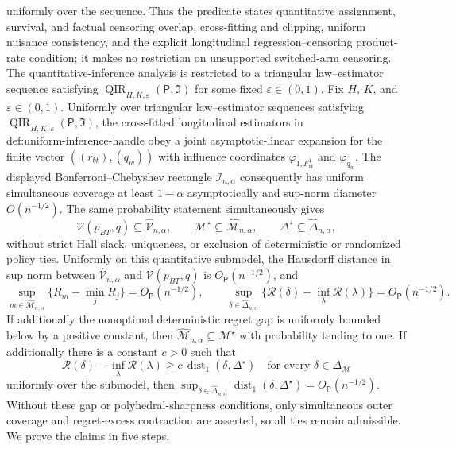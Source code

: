 uniformly over the sequence.  Thus the predicate states quantitative assignment, survival, and factual censoring overlap, cross-fitting and clipping, uniform nuisance consistency, and the explicit longitudinal regression--censoring product-rate condition; it makes no restriction on unsupported switched-arm censoring.
The quantitative-inference analysis is restricted to a triangular law--estimator sequence satisfying \(\operatorname{QIR}_{H,K,\varepsilon}(\mathsf P,\mathfrak I)\) for some fixed \(\varepsilon\in(0,1)\).
Fix \(H\), \(K\), and \(\varepsilon\in(0,1)\).  Uniformly over triangular law--estimator sequences satisfying \(\operatorname{QIR}_{H,K,\varepsilon}(\mathsf P,\mathfrak I)\), the cross-fitted longitudinal estimators in \(\text{def:uniform-inference-handle}\) obey a joint asymptotic-linear expansion for the finite vector \(((r_{bt}),(q_w))\) with influence coordinates \(\varphi_{1,F_{bt}^1}\) and \(\varphi_{q_w}\).  The displayed Bonferroni--Chebyshev rectangle \(\mathcal I_{n,\alpha}\) consequently has uniform simultaneous coverage at least \(1-\alpha\) asymptotically and sup-norm diameter \(O(n^{-1/2})\).  The same probability statement simultaneously gives
\[
 \mathcal V(p_{BT},q)\subseteq\widehat{\mathcal V}_{n,\alpha},\qquad
 \mathcal M^\star\subseteq\widehat{\mathcal M}_{n,\alpha},\qquad
 \Delta^\star\subseteq\widehat\Delta_{n,\alpha},
\]
without strict Hall slack, uniqueness, or exclusion of deterministic or randomized policy ties.  Uniformly on this quantitative submodel, the Hausdorff distance in sup norm between \(\widehat{\mathcal V}_{n,\alpha}\) and \(\mathcal V(p_{BT},q)\) is \(O_{\mathsf P}(n^{-1/2})\), and
\[
 \sup_{m\in\widehat{\mathcal M}_{n,\alpha}}
   \{R_m-\min_jR_j\}=O_{\mathsf P}(n^{-1/2}),
 \qquad
 \sup_{\delta\in\widehat\Delta_{n,\alpha}}
   \{\mathcal R(\delta)-\inf_\lambda\mathcal R(\lambda)\}
   =O_{\mathsf P}(n^{-1/2}).
\]
If additionally the nonoptimal deterministic regret gap is uniformly bounded below by a positive constant, then \(\widehat{\mathcal M}_{n,\alpha}\subseteq\mathcal M^\star\) with probability tending to one.  If additionally there is a constant \(c>0\) such that
\[
 \mathcal R(\delta)-\inf_\lambda\mathcal R(\lambda)
 \ge c\,\operatorname{dist}_1(\delta,\Delta^\star)
 \quad\text{for every }\delta\in\Delta_{\mathcal M}
\]
uniformly over the submodel, then
\(\sup_{\delta\in\widehat\Delta_{n,\alpha}}
\operatorname{dist}_1(\delta,\Delta^\star)=O_{\mathsf P}(n^{-1/2})\).  Without these gap or polyhedral-sharpness conditions, only simultaneous outer coverage and regret-excess contraction are asserted, so all ties remain admissible.
We prove the claims in five steps.

